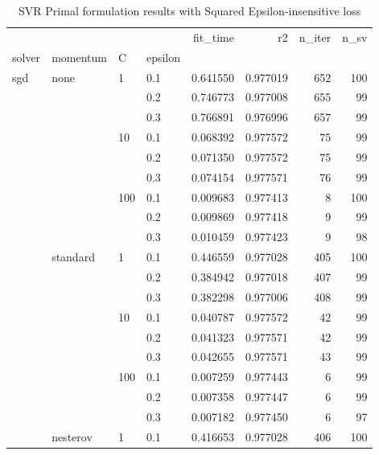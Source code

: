 \begin{table}[H]
\centering
\caption{SVR Primal formulation results with Squared Epsilon-insensitive loss}
\label{primal_l2_svr_cv_results}
\begin{tabular}{llllrrrr}
\toprule
          &   &     &     &  fit\_time &        r2 &  n\_iter &  n\_sv \\
solver & momentum & C & epsilon &           &           &         &       \\
\midrule
sgd & none & 1   & 0.1 &  0.641550 &  0.977019 &     652 &   100 \\
          &   &     & 0.2 &  0.746773 &  0.977008 &     655 &    99 \\
          &   &     & 0.3 &  0.766891 &  0.976996 &     657 &    99 \\
          &   & 10  & 0.1 &  0.068392 &  0.977572 &      75 &    99 \\
          &   &     & 0.2 &  0.071350 &  0.977572 &      75 &    99 \\
          &   &     & 0.3 &  0.074154 &  0.977571 &      76 &    99 \\
          &   & 100 & 0.1 &  0.009683 &  0.977413 &       8 &   100 \\
          &   &     & 0.2 &  0.009869 &  0.977418 &       9 &    99 \\
          &   &     & 0.3 &  0.010459 &  0.977423 &       9 &    98 \\
          & standard & 1   & 0.1 &  0.446559 &  0.977028 &     405 &   100 \\
          &   &     & 0.2 &  0.384942 &  0.977018 &     407 &    99 \\
          &   &     & 0.3 &  0.382298 &  0.977006 &     408 &    99 \\
          &   & 10  & 0.1 &  0.040787 &  0.977572 &      42 &    99 \\
          &   &     & 0.2 &  0.041323 &  0.977571 &      42 &    99 \\
          &   &     & 0.3 &  0.042655 &  0.977571 &      43 &    99 \\
          &   & 100 & 0.1 &  0.007259 &  0.977443 &       6 &    99 \\
          &   &     & 0.2 &  0.007358 &  0.977447 &       6 &    99 \\
          &   &     & 0.3 &  0.007182 &  0.977450 &       6 &    97 \\
          & nesterov & 1   & 0.1 &  0.416653 &  0.977028 &     406 &   100 \\

\end{tabular}
\end{table}
